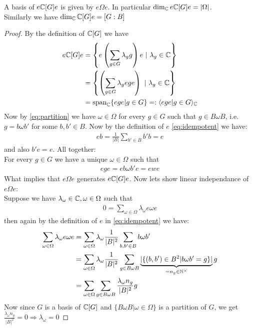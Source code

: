 \documentclass[]{article}
\begin{document}
\begin{proposition}
    A basis of \(e{\mathbb{C}}[G]e\) is given by \(e \Omega e\). In particular \(\dim_{\mathbb{C}} e{\mathbb{C}}[G]e = | \Omega |\). \\ Similarly we have
    \(\dim_{\mathbb{C}} {\mathbb{C}}[G]e = [G:B]\)
\end{proposition}
\begin{proof}
By the definition of \({\mathbb{C}}[G]\) we have
\begin{align*}
    e \C[G]e &= \left\{ e \left(\sum_{g \in G}^{}\lambda_g g\right)e \ | \ \lambda_g \in \C\right\} \\
    &= \left\{ \left(\sum_{g \in G}^{}\lambda_g ege\right) \ | \ \lambda_g \in \C\right\} \\
    &= \text{span}_\C\{ege | g \in G\} =: \langle ege | g \in G \rangle_\C
\end{align*}
Now by \eqref{eq:partition} we have \(\omega \in \Omega\) for every \(g \in G\) such that \(g \in B \omega B\), i.e.
\(g = b \omega b'\) for some \(b,b' \in B\). Now by the definition of \(e\) \eqref{eq:idempotent} we have:
\begin{align*}
    eb = \frac{1}{|B|} \sum_{b'\in B}^{}b'b =e
\end{align*}
and also \(b'e=e\). All together: \\
For every \(g \in G\) we have a unique \(\omega \in \Omega\) such that 
\begin{align*}
    ege = eb\omega b'e=ewe
\end{align*}
What implies that \(e \Omega e\) generates \(e {\mathbb{C}}[G]e\). Now lets show linear independance of \(e \Omega e\): \\
Suppose we have \(\lambda_\omega \in {\mathbb{C}}, \omega \in \Omega\) such that
\begin{align*}
    0 = \sum_{\omega \in \Omega}^{}\lambda_\omega e \omega e 
\end{align*}
then again by the definition of \(e\) in \eqref{eq:idempotent} we have:
\begin{align*}
    \sum_{\omega \in \Omega}^{}\lambda_\omega e \omega e 
    &= \sum_{\omega \in \Omega}^{}\lambda_\omega \frac{1}{|B|^2} \sum_{b,b' \in B}^{}b \omega b' \\
    &= \sum_{\omega \in \Omega}^{}\lambda_\omega \frac{1}{|B|^2} \sum_{g \in B \omega B}^{} \underbrace{|\{(b,b')\in B^2| b \omega b' = g\}|}_{=n_g \in {\mathbb{N}}^\times} g \\
    &= \sum_{\omega \in \Omega}^{} \sum_{g \in B \omega B}^{} \frac{\lambda_\omega n_g}{|B|^2} g \\
\end{align*}
Now since \(G\) is a basis of \({\mathbb{C}}[G]\) and \(\{B \omega B | \omega \in \Omega\}\) is a partition of \(G\), we get \(\frac{\lambda_\omega n_g}{|B|^2} = 0 \Rightarrow \lambda_\omega = 0\)


\end{proof}
\end{document}
